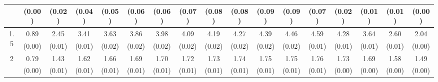 \documentclass[12pt]{article}  %
\theoremstyle{plain}
\begin{document}
\begin{sidewaystable}[htbp]
\begin{tabular}{ccccccccccccccccc}
                       & (0.00)& (0.02)& (0.04)& (0.05)& (0.06)& (0.06)& (0.07)& (0.08)& (0.08)&  (0.09)&  (0.09)&  (0.07)&  (0.02)&  (0.01)&  (0.01) &   (0.00)\\ \hline                                                                                                                                                                                                                                                                                    
\multirow{2}{*}{1.5}  & 0.89 &2.45 & 3.41 & 3.63  & 3.86  & 3.98  & 4.09  & 4.19   &4.27  & 4.39  & 4.46  &4.59 & 4.28 & 3.64 & 2.60 & 2.04\\
                      &  (0.00)& (0.01)& (0.01)& (0.02)& (0.02)& (0.02)& (0.02)& (0.02)& (0.02)&  (0.02)&  (0.02)&  (0.01)&  (0.01)&  (0.01)&  (0.01) &     (0.00)\\ \hline                                                                                                                                                                                                                                                                                    
\multirow{2}{*}{2}  &0.79& 1.43 & 1.62  &1.66  & 1.69  & 1.70  & 1.72  & 1.73  & 1.74  & 1.75   &1.75 & 1.76  &1.73 & 1.69 & 1.58 & 1.49\\
                      &  (0.00)& (0.01)& (0.01)& (0.01)& (0.01)& (0.01)& (0.01)& (0.01)& (0.01)&  (0.01)&  (0.01)&  (0.01)&  (0.00)&  (0.00)&  (0.00) &     (0.00)\\ \hline                                                                                                                                                                                                                                                                                    
\end{tabular}
\end{sidewaystable}
\end{document}
